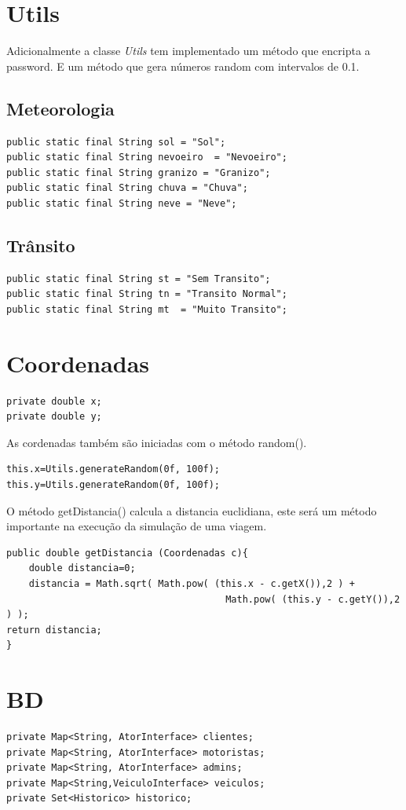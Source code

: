 \section{Utils}
Adicionalmente a classe \textit{Utils} tem implementado um método que encripta a password. E um método que gera números random com intervalos de 0.1. 

\subsection{Meteorologia}
\begin{verbatim}
public static final String sol = "Sol"; 
public static final String nevoeiro  = "Nevoeiro"; 
public static final String granizo = "Granizo";
public static final String chuva = "Chuva";
public static final String neve = "Neve"; 
\end{verbatim}

\subsection{Trânsito}
\begin{verbatim}
public static final String st = "Sem Transito"; 
public static final String tn = "Transito Normal"; 
public static final String mt  = "Muito Transito"; 
\end{verbatim}

\section{Coordenadas}
\begin{verbatim}
private double x;
private double y;
\end{verbatim}

As cordenadas também são iniciadas com o método random(). 
\begin{verbatim}
this.x=Utils.generateRandom(0f, 100f);
this.y=Utils.generateRandom(0f, 100f);
\end{verbatim}

O método getDistancia() calcula a distancia euclidiana, este será um método importante na execução da simulação de uma viagem. 
\begin{verbatim}
public double getDistancia (Coordenadas c){
    double distancia=0; 
    distancia = Math.sqrt( Math.pow( (this.x - c.getX()),2 ) +
                                       Math.pow( (this.y - c.getY()),2 ) );
return distancia; 
}
\end{verbatim}

\section{BD}
\begin{verbatim}
private Map<String, AtorInterface> clientes;
private Map<String, AtorInterface> motoristas; 
private Map<String, AtorInterface> admins; 
private Map<String,VeiculoInterface> veiculos; 
private Set<Historico> historico;
\end{verbatim}

